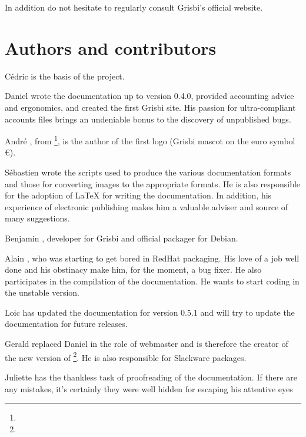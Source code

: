 In addition do not hesitate to regularly consult Grisbi's official website.



\section{Authors and contributors\label{introduction-authors}} %

Cédric  is the basis of the project.

Daniel  wrote the documentation up to version 0.4.0, provided accounting advice and ergonomics, and created the first Grisbi site. His passion for ultra-compliant accounts files brings an undeniable bonus to the discovery of unpublished bugs.

André , from \footnote{\urlLinuxGraphic{}}, is the author of the first logo (Grisbi mascot on the euro symbol €).

Sébastien  wrote the scripts used to produce the various documentation formats and those for converting images to the appropriate formats. He is also responsible for the adoption of \gls{LaTeX} for writing the documentation. In addition, his experience of electronic publishing makes him a valuable adviser and source of many suggestions.

Benjamin , developer for Grisbi and official packager for \gls{Debian}.

Alain , who was starting to get bored in \gls{RedHat} packaging. His love of a job well done and his obstinacy make him, for the moment, a bug fixer. He also participates in the compilation of the documentation. He wants to start coding in the unstable version.

Loic  has updated the documentation for version 0.5.1 and will try to update the documentation for future releases.

Gerald  replaced Daniel  in the role of webmaster and is therefore the creator of the new version of \footnote{\urlGrisbi{}}. He is also responsible for \gls{Slackware} packages.

Juliette  has the thankless task of proofreading of the documentation. If there are any mistakes, it's certainly they were well hidden for escaping his attentive eyes

